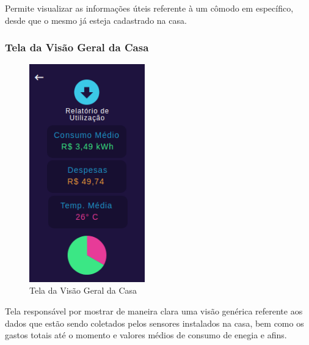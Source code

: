 \par Permite visualizar as informações úteis referente à um cômodo em específico, desde que o mesmo já esteja cadastrado na casa.

\subsubsection{Tela da Visão Geral da Casa}

\begin{figure}[!h]
\centering
\caption{Tela da Visão Geral da Casa}
\includegraphics[width=5cm]{figuras/overview_casa}
\end{figure}

\par Tela responsável por mostrar de maneira clara uma visão genérica referente aos dados que estão sendo coletados pelos sensores instalados na casa, bem como os gastos totais até o momento e valores médios de consumo de enegia e afins.
